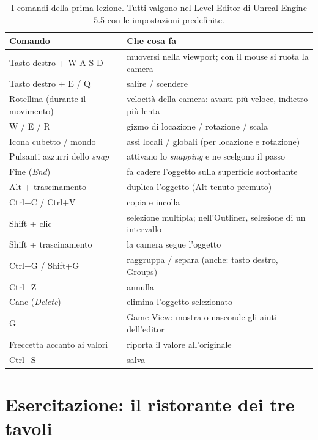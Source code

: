 \begin{table}[htbp]
\centering
\small
\begin{tabular}{@{}p{4.3cm}p{8.7cm}@{}}
\toprule
\textbf{Comando} & \textbf{Che cosa fa} \\
\midrule
Tasto destro + W A S D & muoversi nella viewport; con il mouse si ruota la camera \\
Tasto destro + E / Q & salire / scendere \\
Rotellina (durante il movimento) & velocità della camera: avanti più veloce, indietro
  più lenta \\
W / E / R & gizmo di locazione / rotazione / scala \\
Icona cubetto / mondo & assi locali / globali (per locazione e rotazione) \\
Pulsanti azzurri dello \emph{snap} & attivano lo \emph{snapping} e ne scelgono il
  passo \\
Fine (\emph{End}) & fa cadere l'oggetto sulla superficie sottostante \\
Alt + trascinamento & duplica l'oggetto (Alt tenuto premuto) \\
Ctrl+C / Ctrl+V & copia e incolla \\
Shift + clic & selezione multipla; nell'Outliner, selezione di un intervallo \\
Shift + trascinamento & la camera segue l'oggetto \\
Ctrl+G / Shift+G & raggruppa / separa (anche: tasto destro, Groups) \\
Ctrl+Z & annulla \\
Canc (\emph{Delete}) & elimina l'oggetto selezionato \\
G & Game View: mostra o nasconde gli aiuti dell'editor \\
Freccetta accanto ai valori & riporta il valore all'originale \\
Ctrl+S & salva \\
\bottomrule
\end{tabular}
\caption{I comandi della prima lezione. Tutti valgono nel Level Editor di Unreal Engine
5.5 con le impostazioni predefinite.}
\label{ue1:tab:comandi}
\end{table}

\section{Esercitazione: il ristorante dei tre tavoli}
\label{ue1:sec:esercitazione}

